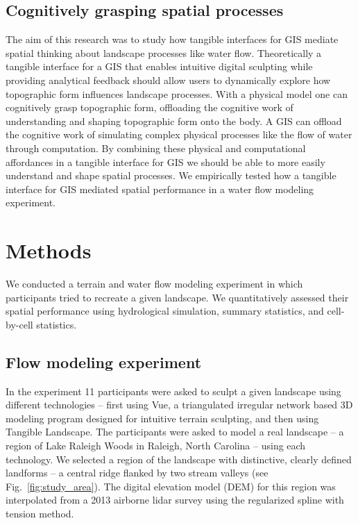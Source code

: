 \documentclass{isprs}
\begin{document}
\subsection{Cognitively grasping spatial processes}
The aim of this research was to study how tangible interfaces for GIS 
mediate spatial thinking about landscape processes like water flow. 
Theoretically a tangible interface for a GIS that enables intuitive digital sculpting while providing analytical %
feedback should allow users to dynamically explore how topographic form influences landscape processes. 
With a physical model one can 
cognitively grasp topographic form, 
offloading the cognitive work of 
understanding and shaping topographic form onto the body. 
A GIS can offload the cognitive work of simulating complex physical processes
like the flow of water through computation. 
By combining these physical and computational affordances in a tangible interface for GIS we should be able to more easily understand and shape spatial processes. 
We empirically tested how a tangible interface for GIS 
mediated spatial performance in a water flow modeling experiment. 


\section{Methods}\label{sec:methods}
%
We conducted a terrain and water flow modeling experiment 
in which participants tried to recreate a given landscape. 
%
We quantitatively assessed their spatial performance using hydrological simulation, summary statistics, and cell-by-cell statistics.

\subsection{Flow modeling experiment}
%
In the experiment 11 participants were asked to sculpt a given landscape using different technologies -- 
first using Vue, a triangulated irregular network based 3D modeling program designed for intuitive terrain sculpting, 
and then using Tangible Landscape. 
%
The participants were asked to model a real landscape --
a region of Lake Raleigh Woods 
in Raleigh, North Carolina  -- 
using each technology. 
We selected a region of the landscape with distinctive, 
clearly defined landforms -- a central ridge flanked by two stream valleys 
(see Fig.~\ref{fig:study_area}). 
The digital elevation model (DEM) for this region was interpolated from a 2013 airborne lidar survey using the regularized spline with tension method.
\end{document}
